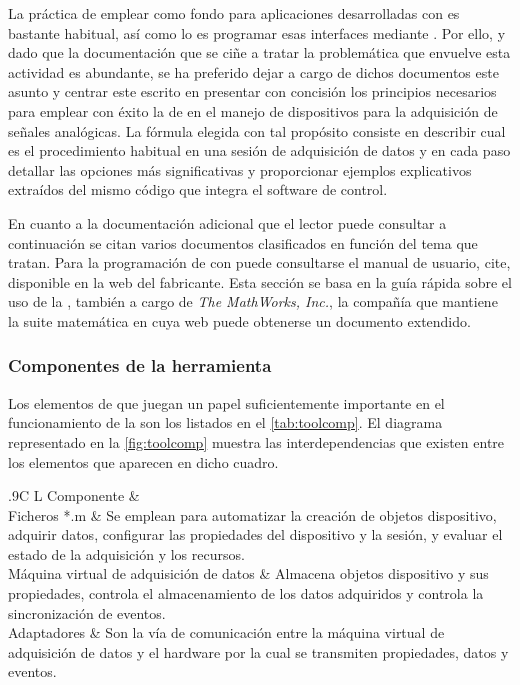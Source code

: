 La práctica de emplear \gui{} como fondo para aplicaciones desarrolladas con \matlab{} es bastante habitual, así como lo es programar esas interfaces mediante \guide{}. Por ello, y dado que la documentación que se ciñe a tratar la problemática que envuelve esta actividad es abundante, se ha preferido dejar a cargo de dichos documentos este asunto y centrar este escrito en presentar con concisión los principios necesarios para emplear con éxito la \datx{} de \matlab{} en el manejo de dispositivos para la adquisición de señales analógicas. La fórmula elegida con tal propósito consiste en describir cual es el procedimiento habitual en una sesión de adquisición de datos y en cada paso detallar las opciones más significativas y proporcionar ejemplos explicativos extraídos del mismo código que integra el software de control.\par
En cuanto a la documentación adicional que el lector puede consultar a continuación se citan varios documentos clasificados en función del tema que tratan. Para la programación de \gui{} con \matlab{} puede consultarse el manual de usuario, cite, disponible en la web del fabricante. Esta sección se basa en la guía rápida sobre el uso de la \datx{}, también a cargo de \emph{The MathWorks, Inc.}, la compañía que mantiene la suite matemática en cuya web puede obtenerse un documento extendido.


\subsubsection{Componentes de la herramienta}

Los elementos de \matlab{} que juegan un papel suficientemente importante en el funcionamiento de la \datx{} son los listados en el \cref{tab:toolcomp}. El diagrama representado en la \vref{fig:toolcomp} muestra las interdependencias que existen entre los elementos que aparecen en dicho cuadro.

\begin{table}
	\centering
	\begin{tabulary}{.9\textwidth}{C L}
		\toprule
		Componente &  \\
		\midrule
		Ficheros *.m & Se emplean para automatizar la creación de objetos dispositivo, adquirir datos, configurar las propiedades del dispositivo y la sesión, y evaluar el estado de la adquisición y los recursos.\\
		\midrule
		Máquina virtual de adquisición de datos & Almacena objetos dispositivo y sus propiedades, controla el almacenamiento de los datos adquiridos y controla la sincronización de eventos.\\
		\midrule
		Adaptadores & Son la vía de comunicación entre la máquina virtual de adquisición de datos y el hardware por la cual se transmiten propiedades, datos y eventos.\\
		\bottomrule
	\end{tabulary}
	\caption[Descripción de los componentes de la \datx{}]{Descripción de los componentes de la \datx{}.}
	\label{tab:toolcomp}
\end{table}

